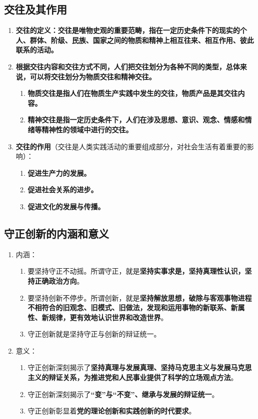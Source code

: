 \documentclass[12pt, a4paper, oneside]{ctexbook}
\begin{document}
\subsection{交往及其作用}

\begin{enumerate}
\item \textbf{交往的定义：交往是唯物史观的重要范畴，指在一定历史条件下的现实的个人、群体、阶级、民族、国家之间的物质和精神上相互往来、相互作用、彼此联系的活动。}
\item \textbf{根据交往内容和交往方式不同，人们把交往划分为各种不同的类型，总体来说，可以将交往划分为物质交往和精神交往。}
\begin{enumerate}
\item \textbf{物质交往是指人们在物质生产实践中发生的交往，物质产品是其交往内容。}
\item \textbf{精神交往是指一定历史条件下，人们在涉及思想、意识、观念、情感和情绪等精神性的领域中进行的交往。}
\end{enumerate}
\item \textbf{交往的作用}（交往是人类实践活动的重要组成部分，对社会生活有着重要的影响）：
\begin{enumerate}
\item \textbf{促进生产力的发展。}
\item \textbf{促进社会关系的进步。}
\item \textbf{促进文化的发展与传播。}
\end{enumerate}
\end{enumerate}

\subsection{守正创新的内涵和意义}

\begin{enumerate}
\item 内涵：
\begin{enumerate}
\item 要坚持守正不动摇。所谓守正，就是\textbf{坚持实事求是，坚持真理性认识，坚持正确政治方向}。
\item 要坚持创新不停步。所谓创新，就是\textbf{坚持解放思想，破除与客观事物进程不相符合的旧观念、旧模式、旧做法，发现和运用事物的新联系、新属性、新规律，更有效地认识世界和改造世界}。
\item 守正创新就是坚持守正与创新的辩证统一。
\end{enumerate}
\item 意义：
\begin{enumerate}
\item 守正创新深刻揭示了\textbf{坚持真理与发展真理、坚持马克思主义与发展马克思主义的辩证关系，为推进党和人民事业提供了科学的立场观点方法}。
\item 守正创新深刻揭示了\textbf{“变”与“不变”、继承与发展的辩证统一}。
\item 守正创新彰显着\textbf{党的理论创新和实践创新的时代要求}。
\end{enumerate}
\end{enumerate}
\end{document}
